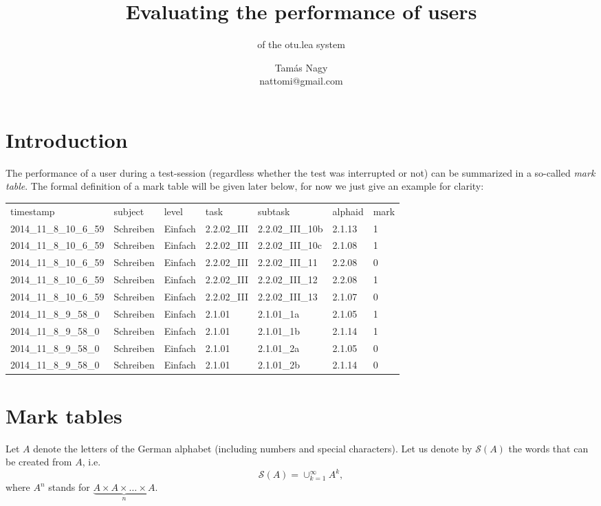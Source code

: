 \documentclass{scrartcl}
\title{Evaluating the performance of users}
\subtitle{of the otu.lea system}
\author{Tamás Nagy\\ \small nattomi@gmail.com}
\begin{document}
\maketitle
\section{Introduction}
The performance of a user during a test-session (regardless whether the test was interrupted or not) can be summarized in a so-called \emph{mark table}. The formal definition of a mark table will be given later below, for now we just give an example for clarity:

\vspace{.5cm}
\begin{tabular}{lllllll}
timestamp	& subject	& level	& task	& subtask	& alphaid	& mark\\
2014\_11\_8\_10\_6\_59	& Schreiben	& Einfach	& 2.2.02\_III	& 2.2.02\_III\_10b	& 2.1.13	& 1\\
2014\_11\_8\_10\_6\_59	& Schreiben	& Einfach	& 2.2.02\_III	& 2.2.02\_III\_10c	& 2.1.08	& 1\\
2014\_11\_8\_10\_6\_59	& Schreiben	& Einfach	& 2.2.02\_III	& 2.2.02\_III\_11	& 2.2.08	& 0\\
2014\_11\_8\_10\_6\_59	& Schreiben	& Einfach	& 2.2.02\_III	& 2.2.02\_III\_12	& 2.2.08	& 1\\
2014\_11\_8\_10\_6\_59	& Schreiben	& Einfach	& 2.2.02\_III	& 2.2.02\_III\_13	& 2.1.07	& 0\\
2014\_11\_8\_9\_58\_0	& Schreiben	& Einfach	& 2.1.01	& 2.1.01\_1a	& 2.1.05	& 1\\
2014\_11\_8\_9\_58\_0	& Schreiben	& Einfach	& 2.1.01	& 2.1.01\_1b	& 2.1.14	& 1\\
2014\_11\_8\_9\_58\_0	& Schreiben	& Einfach	& 2.1.01	& 2.1.01\_2a	& 2.1.05	& 0\\
2014\_11\_8\_9\_58\_0	& Schreiben	& Einfach	& 2.1.01	& 2.1.01\_2b	& 2.1.14	& 0\\
\end{tabular}

\section{Mark tables}
Let $A$ denote the letters of the German alphabet (including numbers and special characters). Let us denote by $\mathcal{S}(A)$ the words that can be created from $A$, i.e.
$$\mathcal{S}(A)=\cup_{k=1}^{\infty}A^k,$$
where $A^n$ stands for $\underbrace{A\times A\times\ldots \times A}_{n}$. 
\end{document}
